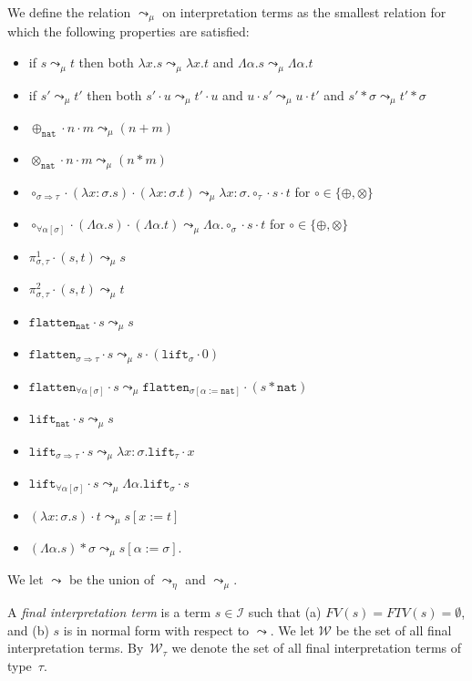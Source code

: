 \documentclass[runningheads,a4paper]{llncs}
\newcommand{\Iterms}{\mathcal{I}}
\newcommand{\World}{\mathcal{W}}
\newcommand{\quant}[2]{\forall #1[#2]}
\newcommand{\arrtype}{\Rightarrow}
\newcommand{\arreta}{\leadsto_\eta}
\newcommand{\arrnormalise}{\leadsto}
\newcommand{\normstep}{\leadsto_\mu}
\newcommand{\abs}[2]{\lambda #1.#2}
\newcommand{\tabs}[2]{\Lambda #1.#2}
\newcommand{\app}[2]{#1 \cdot #2}
\newcommand{\tapp}[2]{#1 * #2}
\newcommand{\subst}[2]{#1:=#2}
\newcommand{\FTV}{\mathit{FTV}}
\newcommand{\FV}{\mathit{FV}}
\newcommand{\nat}{\mathtt{nat}}
\newcommand{\proj}{\pi}
\newcommand{\flatten}{\mathtt{flatten}}
\newcommand{\lift}{\mathtt{lift}}
\begin{document}
\begin{definition}
We define the relation $\normstep$ on interpretation terms as the
smallest relation for which the following properties are satisfied:
\begin{itemize}
\item if $s \normstep t$ then both $\abs{x}{s} \normstep \abs{x}{t}$ and
  $\tabs{\alpha}{s} \normstep \tabs{\alpha}{t}$
\item if $s' \normstep t'$ then both $\app{s'}{u} \normstep \app{t'}{u}$
  and $\app{u}{s'} \normstep \app{u}{t'}$ and $\tapp{s'}{\sigma} \normstep
  \tapp{t'}{\sigma}$
\item $\app{\app{\oplus_{\nat}}{n}}{m} \normstep (n+m)$ 
\item $\app{\app{\otimes_{\nat}}{n}}{m} \normstep (n * m)$ 
\item $\app{\app{\circ_{\sigma \arrtype \tau}}{(\abs{x:\sigma}{s})}}{
  (\abs{x:\sigma}{t})} \normstep \abs{x:\sigma}{\app{\app{\circ_\tau}{
  s}}{t}}$ for $\circ \in \{ \oplus, \otimes \}$
\item $\app{\app{\circ_{\quant{\alpha}{\sigma}}}{(\tabs{\alpha}{s})}}{
    (\tabs{\alpha}{t})} \normstep \tabs{\alpha}{\app{\app{\circ_\sigma}{s}}{t}}$
  for $\circ \in \{ \oplus, \otimes \}$
\item $\app{\proj^1_{\sigma,\tau}}{(s,t)} \normstep s$
\item $\app{\proj^2_{\sigma,\tau}}{(s,t)} \normstep t$
\item $\app{\flatten_\nat}{s} \normstep s$
\item $\app{\flatten_{\sigma \arrtype \tau}}{s} \normstep
  \app{s}{(\app{\lift_\sigma}{0})}$
\item $\app{\flatten_{\quant{\alpha}{\sigma}}}{s} \normstep
  \app{\flatten_{\sigma[\subst{\alpha}{\nat}]}}{(\tapp{s}{\nat})}$
\item $\app{\lift_\nat}{s} \normstep s$
\item $\app{\lift_{\sigma \arrtype \tau}}{s} \normstep
  \abs{x:\sigma}{\app{\lift_{\tau}}{x}}$
\item $\app{\lift_{\quant{\alpha}{\sigma}}}{s} \normstep
  \tabs{\alpha}{\app{\lift_{\sigma}}{s}}$
\item $\app{(\abs{x:\sigma}{s})}{t} \normstep s[\subst{x}{t}]$
\item $\tapp{(\tabs{\alpha}{s})}{\sigma} \normstep
  s[\subst{\alpha}{\sigma}]$.
\end{itemize}
We let $\arrnormalise$ be the union of $\arreta$ and $\normstep$.

A \emph{final interpretation term} is a term $s \in \Iterms$ such that
(a) $\FV(s) = \FTV(s) = \emptyset$, and (b) $s$ is in normal form with
respect to $\arrnormalise$.  We let $\World$ be the set of all final
interpretation terms. By~$\World_\tau$ we denote the set of all final
interpretation terms of type~$\tau$.
\end{definition}
\end{document}
